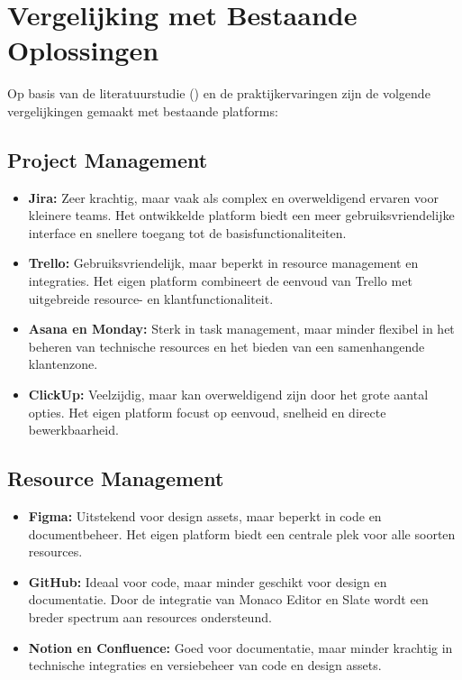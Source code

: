 \section{Vergelijking met Bestaande Oplossingen}
\label{sec:vergelijking-bestaand}

Op basis van de literatuurstudie (\textcite{stand-van-zaken}) en de praktijkervaringen zijn de volgende vergelijkingen gemaakt met bestaande platforms:

\subsection{Project Management}
\begin{itemize}
    \item \textbf{Jira:} Zeer krachtig, maar vaak als complex en overweldigend ervaren voor kleinere teams. Het ontwikkelde platform biedt een meer gebruiksvriendelijke interface en snellere toegang tot de basisfunctionaliteiten.
    \item \textbf{Trello:} Gebruiksvriendelijk, maar beperkt in resource management en integraties. Het eigen platform combineert de eenvoud van Trello met uitgebreide resource- en klantfunctionaliteit.
    \item \textbf{Asana en Monday:} Sterk in task management, maar minder flexibel in het beheren van technische resources en het bieden van een samenhangende klantenzone.
    \item \textbf{ClickUp:} Veelzijdig, maar kan overweldigend zijn door het grote aantal opties. Het eigen platform focust op eenvoud, snelheid en directe bewerkbaarheid.
\end{itemize}

\subsection{Resource Management}
\begin{itemize}
    \item \textbf{Figma:} Uitstekend voor design assets, maar beperkt in code en documentbeheer. Het eigen platform biedt een centrale plek voor alle soorten resources.
    \item \textbf{GitHub:} Ideaal voor code, maar minder geschikt voor design en documentatie. Door de integratie van Monaco Editor en Slate wordt een breder spectrum aan resources ondersteund.
    \item \textbf{Notion en Confluence:} Goed voor documentatie, maar minder krachtig in technische integraties en versiebeheer van code en design assets.
\end{itemize}

